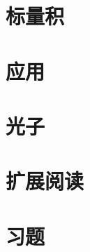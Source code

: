 \section{标量积}
\label{sec2.5}

\section{应用}
\label{sec2.6}

\section{光子}
\label{sec2.7}

\section{扩展阅读}
\label{sec2.8}

\section{习题}
\label{sec2.9}